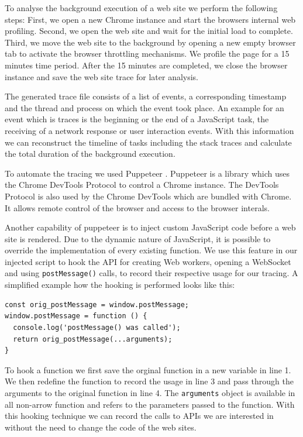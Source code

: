 \documentclass[
	ruledheaders=section,%
	class=report,%
	thesis={type=bachelor},%
	accentcolor=9c,%
	custommargins=true,%
	marginpar=false,%
	parskip=half-,%
	fontsize=11pt,%
]{tudapub}
\begin{document}
  To analyse the background execution of a web site we perform the following steps: First, we open a new Chrome instance and start the browsers internal web profiling. Second, we open the web site and wait for the initial load to complete. Third, we move the web site to the background by opening a new empty browser tab to activate the browser throttling mechanisms. We profile the page for a 15 minutes time period. After the 15 minutes are completed, we close the browser instance and save the web site trace for later analysis.
  
  The generated trace file consists of a list of events, a corresponding timestamp and the thread and process on which the event took place. An example for an event which is traces is the beginning or the end of a JavaScript task, the receiving of a network response or user interaction events. With this information we can reconstruct the timeline of tasks including the stack traces and calculate the total duration of the background execution.
    
  To automate the tracing we used Puppeteer \cite{pptr}. Puppeteer is a library which uses the Chrome DevTools Protocol \cite{chrome-devtools-protocol} to control a Chrome instance. The DevTools Protocol is also used by the Chrome DevTools which are bundled with Chrome. It allows remote control of the browser and access to the browser interals.

  Another capability of puppeteer is to inject custom JavaScript code before a web site is rendered. Due to the dynamic nature of JavaScript, it is possible to override the implementation of every existing function. We use this feature in our injected script to hook the API for creating Web workers, opening a WebSocket and using \texttt{postMessage()} calls, to record their respective usage for our tracing. A simplified example how the hooking is performed looks like this:

\begin{lstlisting}
const orig_postMessage = window.postMessage;
window.postMessage = function () {
  console.log('postMessage() was called');
  return orig_postMessage(...arguments);
}
\end{lstlisting}

  To hook a function we first save the orginal function in a new variable in line 1. We then redefine the function to record the usage in line 3 and pass through the arguments to the original function in line 4. The \texttt{arguments} object is available in all non-arrow function and refers to the parameters passed to the function. With this hooking technique we can record the calls to APIs we are interested in without the need to change the code of the web sites.
\end{document}
